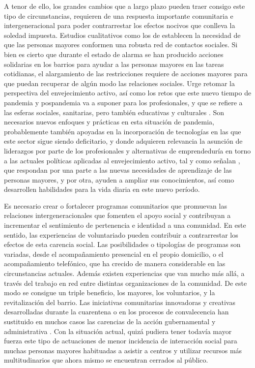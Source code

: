 \documentclass{textolivre}
\begin{document}
A tenor de ello, los grandes cambios que a largo plazo pueden traer consigo este tipo de circunstancias, requieren de una respuesta importante comunitaria e intergeneracional para poder contrarrestar los efectos nocivos que conlleva la soledad impuesta. Estudios cualitativos como los de \textcite{rodriguez2019} %
establecen la necesidad de que las personas mayores conformen una robusta red de contactos sociales. Si bien es cierto que durante el estado de alarma se han producido acciones solidarias en los barrios para ayudar a las personas mayores en las tareas cotidianas, el alargamiento de las restricciones requiere de acciones mayores para que puedan recuperar de algún modo las relaciones sociales. Urge retomar la perspectiva del envejecimiento activo, así como los retos que este nuevo tiempo de pandemia y pospandemia va a suponer para los profesionales, y que se refiere a las esferas sociales, sanitarias, pero también educativas y culturales \cite{cuesta2020}. %
Son necesarios nuevos enfoques y prácticas en esta situación de pandemia, probablemente también apoyadas en la incorporación de tecnologías en las que este sector sigue siendo deficitario, y donde adquieren relevancia la asunción de liderazgos por parte de los profesionales y alternativas de emprendeduría en torno a las actuales políticas aplicadas al envejecimiento activo, tal y como señalan \textcite{hinojolucena2018}, %
que respondan  por una parte a las nuevas necesidades de aprendizaje de las personas mayores, y por otra, ayuden a ampliar sus conocimientos, así como desarrollen habilidades  para la vida diaria en este nuevo período.

Es necesario crear o fortalecer programas comunitarios que promuevan las relaciones intergeneracionales que fomenten el apoyo social y contribuyan a incrementar el sentimiento de pertenencia e identidad a una comunidad. En este sentido, las experiencias de voluntariado pueden contribuir a contrarrestar los efectos de esta carencia social. Las posibilidades o tipologías de programas son variadas, desde el acompañamiento presencial en el propio domicilio, o el acompañamiento telefónico, que ha crecido de manera considerable en las circunstancias actuales. Además existen experiencias que van mucho más allá, a través del trabajo en red entre distintas organizaciones de la comunidad. De este modo se consigue un triple beneficio, los mayores, los voluntarios, y la revitalización del barrio. Las iniciativas comunitarias innovadoras y creativas desarrolladas durante la cuarentena o en los procesos de convalecencia han sustituido en muchos casos las carencias de la acción gubernamental y administrativa \cite{gonzalez2020}. %
Con la situación actual, quizá pudiera tener todavía mayor fuerza este tipo de actuaciones de menor incidencia de interacción social para muchas personas mayores habituadas a asistir a centros y utilizar recursos más multitudinarios que ahora mismo se encuentran cerrados al público.
\end{document}
